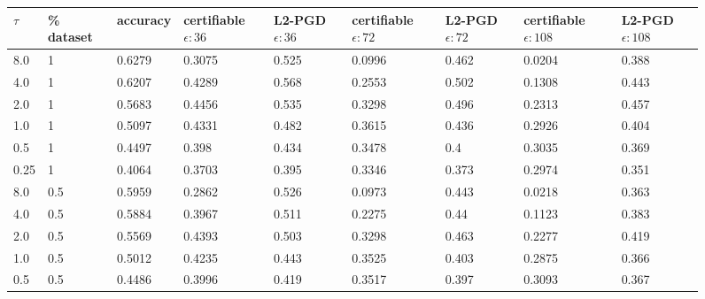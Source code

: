    \begin{figure}
        \small
        \centering
        \begin{tabular}{llp{1.2cm}p{1.2cm}p{1.2cm}p{1.2cm}p{1.2cm}p{1.2cm}p{1.2cm}}
            \hline
            $\tau$ & \% dataset & accuracy & certifiable\newline $\epsilon:36$ & L2-PGD \newline $\epsilon:36$ &  certifiable \newline $\epsilon:72$ & L2-PGD \newline $\epsilon:72$ & certifiable \newline $\epsilon:108$ & L2-PGD \newline $\epsilon:108$ \\
            \hline
               8.0 &         1 &   0.6279 &          0.3075 &      0.525 &          0.0996 &      0.462 &           0.0204 &       0.388 \\
               4.0 &         1 &   0.6207 &          0.4289 &      0.568 &          0.2553 &      0.502 &           0.1308 &       0.443 \\
               2.0 &         1 &   0.5683 &          0.4456 &      0.535 &          0.3298 &      0.496 &           0.2313 &       0.457 \\
               1.0 &         1 &   0.5097 &          0.4331 &      0.482 &          0.3615 &      0.436 &           0.2926 &       0.404 \\
               0.5 &         1 &   0.4497 &           0.398 &      0.434 &          0.3478 &        0.4 &           0.3035 &       0.369 \\
              0.25 &         1 &   0.4064 &          0.3703 &      0.395 &          0.3346 &      0.373 &           0.2974 &       0.351 \\
               8.0 &       0.5 &   0.5959 &          0.2862 &      0.526 &          0.0973 &      0.443 &           0.0218 &       0.363 \\
               4.0 &       0.5 &   0.5884 &          0.3967 &      0.511 &          0.2275 &       0.44 &           0.1123 &       0.383 \\
               2.0 &       0.5 &   0.5569 &          0.4393 &      0.503 &          0.3298 &      0.463 &           0.2277 &       0.419 \\
               1.0 &       0.5 &   0.5012 &          0.4235 &      0.443 &          0.3525 &      0.403 &           0.2875 &       0.366 \\
               0.5 &       0.5 &   0.4486 &          0.3996 &      0.419 &          0.3517 &      0.397 &           0.3093 &       0.367 \\

\end{tabular}
\end{figure}
